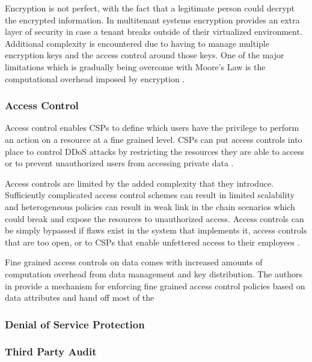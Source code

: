 \documentclass[12pt]{article}
\begin{document}
Encryption is not perfect, with the fact that a legitimate person could decrypt the encrypted information. In multitenant systems encryption provides an extra layer of security in case a tenant breaks outside of their virtualized environment. Additional complexity is encountered due to having to manage multiple encryption keys and the access control around those keys. One of the major limitations which is gradually being overcome with Moore's Law is the computational overhead imposed by encryption \cite{liu2015survey}.

\subsubsection{Access Control}

Access control enables CSPs to define which users have the privilege to perform an action on a resource at a fine grained level. CSPs can put access controls into place to control DDoS attacks by restricting the resources they are able to access or to prevent unauthorized users from accessing private data \cite{liu2015survey}.

Access controls are limited by the added complexity that they introduce. Sufficiently complicated access control schemes can result in limited scalability and heterogeneous policies can result in weak link in the chain scenarios which could break and expose the resources to unauthorized access. Access controls can be simply bypassed if flaws exist in the system that implements it, access controls that are too open, or to CSPs that enable unfettered access to their employees \cite{kazim2015survey}.

Fine grained access controls on data comes with increased amounts of computation overhead from data management and key distribution. The authors in \cite{access2010} provide a mechanism for enforcing fine grained access control policies based on data attributes and hand off most of the 



\subsubsection{Denial of Service Protection}



\subsubsection{Third Party Audit}
\end{document}
